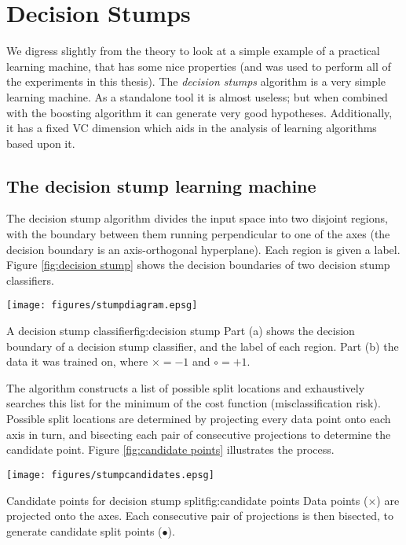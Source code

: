 
\chapter{Decision Stumps}
\label{chapter:stumps}

We digress slightly from the theory to look at a simple example of a
practical learning machine, that has some nice properties (and was used
to perform all of the experiments in this thesis).
The \emph{decision stumps} algorithm is a very simple learning
machine.  As a standalone tool it is almost useless; but when
combined with the boosting algorithm it can generate very good
hypotheses.  Additionally, it has a fixed VC dimension which aids in
the analysis of learning algorithms based upon it.

\section{The decision stump learning machine}

The decision stump algorithm divides the input space into two disjoint
regions, with the boundary between them running perpendicular to one
of the axes (the decision boundary is an axis-orthogonal hyperplane).
Each region is given a label.  Figure \ref{fig:decision stump} shows
the decision boundaries of two decision stump classifiers.

\begin{linefigure}
\begin{center}
\texttt{[image: figures/stumpdiagram.epsg]}
\end{center}
\begin{capt}{A decision stump classifier}{fig:decision stump}
Part (a) shows the decision boundary of a decision stump classifier,
and the label of each region.  Part (b) the data it was trained on,
where $\times = -1$ and $\circ = +1$.
\end{capt}
\end{linefigure}

The algorithm constructs a list of possible split locations and
exhaustively searches this list for the minimum of the cost function
(misclassification risk).  Possible split locations are determined by
projecting every data point onto each axis in turn, and bisecting each
pair of consecutive projections to determine the candidate point.
Figure \ref{fig:candidate points} illustrates the process.

\begin{linefigure}
\begin{center}
\texttt{[image: figures/stumpcandidates.epsg]}
\end{center}
\begin{capt}{Candidate points for decision stump split}{fig:candidate points}
Data points ($\times$) are projected onto the axes.  Each consecutive
pair of projections is then bisected, to generate candidate split
points ($\bullet$).
\end{capt}
\end{linefigure}

